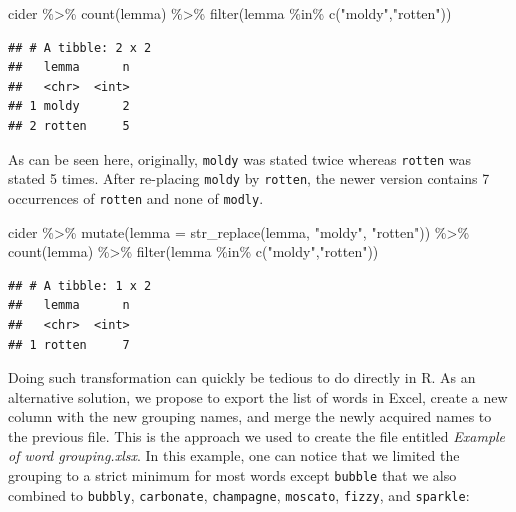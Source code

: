 \documentclass[
]{krantz}
\makeatletter
\newenvironment{Shaded}{\begin{snugshade}}{\end{snugshade}}
\newcommand{\AttributeTok}[1]{\textcolor[rgb]{0.61,0.61,0.61}{#1}}
\newcommand{\FunctionTok}[1]{\textcolor[rgb]{0,0,0}{#1}}
\newcommand{\NormalTok}[1]{#1}
\newcommand{\SpecialCharTok}[1]{\textcolor[rgb]{0,0,0}{#1}}
\newcommand{\StringTok}[1]{\textcolor[rgb]{0.5,0.5,0.5}{#1}}
\newenvironment{kframe}{%
\medskip{}
\setlength{\fboxsep}{.8em}
 \def\at@end@of@kframe{}%
 \ifinner\ifhmode%
  \def\at@end@of@kframe{\end{minipage}}%
  \begin{minipage}{\columnwidth}%
 \fi\fi%
 \def\FrameCommand##1{\hskip\@totalleftmargin \hskip-\fboxsep
 \colorbox{shadecolor}{##1}\hskip-\fboxsep
     \hskip-\linewidth \hskip-\@totalleftmargin \hskip\columnwidth}%
 \MakeFramed {\advance\hsize-\width
   \@totalleftmargin\z@ \linewidth\hsize
   \@setminipage}}%
 {\par\unskip\endMakeFramed%
 \at@end@of@kframe}
\renewenvironment{Shaded}{\begin{kframe}}{\end{kframe}}
\makeatother
\begin{document}
\begin{Shaded}
\begin{Highlighting}[]
\NormalTok{cider }\SpecialCharTok{\%\textgreater{}\%} 
  \FunctionTok{count}\NormalTok{(lemma) }\SpecialCharTok{\%\textgreater{}\%} 
  \FunctionTok{filter}\NormalTok{(lemma }\SpecialCharTok{\%in\%} \FunctionTok{c}\NormalTok{(}\StringTok{"moldy"}\NormalTok{,}\StringTok{"rotten"}\NormalTok{))}
\end{Highlighting}
\end{Shaded}

\begin{verbatim}
## # A tibble: 2 x 2
##   lemma      n
##   <chr>  <int>
## 1 moldy      2
## 2 rotten     5
\end{verbatim}

As can be seen here, originally, \texttt{moldy} was stated twice whereas \texttt{rotten} was stated 5 times. After re-placing \texttt{moldy} by \texttt{rotten}, the newer version contains 7 occurrences of \texttt{rotten} and none of \texttt{modly}.

\begin{Shaded}
\begin{Highlighting}[]
\NormalTok{cider }\SpecialCharTok{\%\textgreater{}\%} 
  \FunctionTok{mutate}\NormalTok{(}\AttributeTok{lemma =} \FunctionTok{str\_replace}\NormalTok{(lemma, }\StringTok{"moldy"}\NormalTok{, }\StringTok{"rotten"}\NormalTok{)) }\SpecialCharTok{\%\textgreater{}\%} 
  \FunctionTok{count}\NormalTok{(lemma) }\SpecialCharTok{\%\textgreater{}\%} 
  \FunctionTok{filter}\NormalTok{(lemma }\SpecialCharTok{\%in\%} \FunctionTok{c}\NormalTok{(}\StringTok{"moldy"}\NormalTok{,}\StringTok{"rotten"}\NormalTok{))}
\end{Highlighting}
\end{Shaded}

\begin{verbatim}
## # A tibble: 1 x 2
##   lemma      n
##   <chr>  <int>
## 1 rotten     7
\end{verbatim}

Doing such transformation can quickly be tedious to do directly in R. As an alternative solution, we propose to export the list of words in Excel, create a new column with the new grouping names, and merge the newly acquired names to the previous file. This is the approach we used to create the file entitled \emph{Example of word grouping.xlsx}. In this example, one can notice that we limited the grouping to a strict minimum for most words except \texttt{bubble} that we also combined to \texttt{bubbly}, \texttt{carbonate}, \texttt{champagne}, \texttt{moscato}, \texttt{fizzy}, and \texttt{sparkle}:
\end{document}
